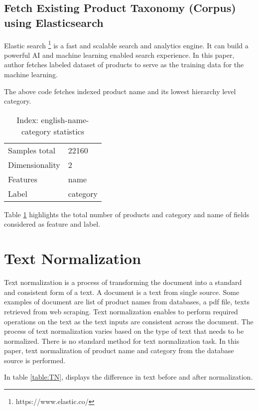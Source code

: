 \subsection {Fetch Existing Product Taxonomy (Corpus) using Elasticsearch}
Elastic search \footnote{https://www.elastic.co/} is a fast and scalable search and analytics engine. It can build a powerful AI and machine learning enabled search experience. In this paper, author fetches labeled dataset of products to serve as the training data for the machine learning.


The above code fetches indexed product name and its lowest hierarchy level category.  
\begin{table}[h]
      \caption{Index: english-name-category statistics}
      \centering
      \label{table:enc}
\begin{tabular}{ll}
      \toprule 

      Samples total&22160 \\
      Dimensionality&2 \\
      Features&name \\
      Label&category \\
      
      \bottomrule
\end{tabular}
\end{table}

Table \ref{table:enc} highlights the total number of products and category and name of fields considered as feature and label. 

\clearpage
\section{Text Normalization} \label{text_normalization}

Text normalization is a process of transforming the document into a standard and consistent form of a text. A document is a text from single source. Some examples of document are list of product names from databases, a pdf file, texts retrieved from web scraping. Text normalization enables to perform required operations on the text as the text inputs are consistent across the document. The process of text normalization varies based on the type of text that needs to be normalized. There is no standard method for text normalization task. In this paper, text normalization of product name and category from the database source is performed. 

In table \ref{table:TN}, displays the difference in text before and after normalization. 

